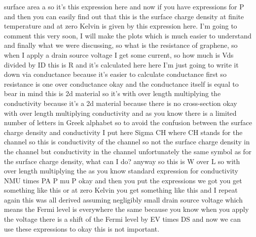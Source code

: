 surface area a so it's this expression here and now if you have expressions for P and then you can easily find out that this is the surface charge density at finite temperature and at zero Kelvin is given by this expression here. I'm going to comment this very soon, I will make the plots which is much easier to understand and finally what we were discussing, so what is the resistance of graphene, so when I apply a drain source voltage I get some current, so how much is Vds divided by ID this is R and it's calculated here here I'm just going to write it down via conductance because it's easier to calculate conductance first so resistance is one over conductance okay and the conductance itself is equal to bear in mind this is 2d material so it's with over length multiplying the conductivity because it's a 2d material because there is no cross-section okay with over length multiplying conductivity and as you know there is a limited number of letters in Greek alphabet so to avoid the confusion between the surface charge density and conductivity I put here Sigma CH where CH stands for the channel so this is conductivity of the channel so not the surface charge density in the channel but conductivity in the channel unfortunately the same symbol as for the surface charge density, what can I do? anyway so this is W over L so with over length multiplying the as you know standard expression for conductivity NMU times PA P mu P okay and then you put the expressions we got you get something like this or at zero Kelvin you get something like this and I repeat again this was all derived assuming negligibly small drain source voltage which means the Fermi level is everywhere the same because you know when you apply the voltage there is a shift of the Fermi level by EV times DS and now we can use these expressions to okay this is not important.
